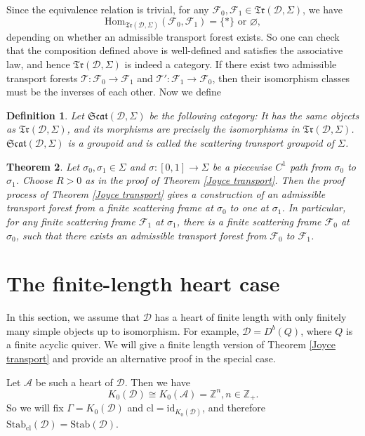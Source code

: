 \documentclass[a4paper,12pt]{amsart}
\numberwithin{equation}{section}
\newtheorem{theorem}{Theorem}[section]
\newtheorem{definition}[theorem]{Definition}
\newcommand{\Hom}{\mathrm{Hom}}
\newcommand{\id}{\mathrm{id}}
\newcommand{\Stab}{\mathrm{Stab}}
\newcommand{\cl}{\mathrm{cl}}
\newcommand{\1}{\mathbf{1}}
\begin{document}
Since the equivalence relation is trivial, for any $\mathscr{F}_0,\mathscr{F}_1\in\mathfrak{Tr}(\mathcal{D},\Sigma)$, we have
\[\Hom_{\mathfrak{Tr}(\mathcal{D},\Sigma)}(\mathscr{F}_0,\mathscr{F}_1)=\{*\}\text{ or }\varnothing,\]
depending on whether an admissible transport forest exists. So one can check that the composition defined above is well-defined and satisfies the associative law, and hence $\mathfrak{Tr}(\mathcal{D},\Sigma)$ is indeed a category. If there exist two admissible transport forests $\mathscr{T}:\mathscr{F}_0\rightarrow\mathscr{F}_1$ and $\mathscr{T}':\mathscr{F}_1\rightarrow\mathscr{F}_0$,
then their isomorphism classes must be the inverses of each other. Now we define
\begin{definition}
    Let $\mathfrak{Scat}(\mathcal{D},\Sigma)$ be the following category: It has the same objects as $\mathfrak{Tr}(\mathcal{D},\Sigma)$, and its morphisms are precisely the isomorphisms in $\mathfrak{Tr}(\mathcal{D},\Sigma)$. $\mathfrak{Scat}(\mathcal{D},\Sigma)$ is a groupoid and is called the \emph{scattering transport groupoid} of $\Sigma$.
\end{definition}
\begin{theorem}
    Let $\sigma_0,\sigma_1\in\Sigma$ and $\sigma:[0,1]\rightarrow\Sigma$ be a piecewise $C^1$ path from $\sigma_0$ to $\sigma_1$. Choose $R>0$ as in the proof of Theorem \ref{Joyce transport}. Then the proof process of Theorem \ref{Joyce transport} gives a construction of an admissible transport forest from a finite scattering frame at $\sigma_0$ to one at $\sigma_1$. In particular, for any finite scattering frame $\mathscr{F}_1$ at $\sigma_1$, there is a finite scattering frame $\mathscr{F}_0$ at $\sigma_0$, such that there exists an admissible transport forest from $\mathscr{F}_0$ to $\mathscr{F}_1$.
\end{theorem}
\section{The finite-length heart case}
In this section, we assume that $\mathcal{D}$ has a heart of finite length with only finitely many simple objects up to isomorphism. For example, $\mathcal{D}=D^b(Q)$, where $Q$ is a finite acyclic quiver. We will give a finite length version of Theorem \ref{Joyce transport} and provide an alternative proof in the special case.

Let $\mathcal{A}$ be such a heart of $\mathcal{D}$. Then we have
\[K_0(\mathcal{D})\cong K_0(\mathcal{A})=\mathbb{Z}^n,n\in\mathbb{Z}_+.\]
So we will fix $\Gamma=K_0(\mathcal{D})$ and $\cl=\id_{K_0(\mathcal{D})}$, and therefore $\Stab_\cl(\mathcal{D})=\Stab(\mathcal{D})$.
\end{document}
